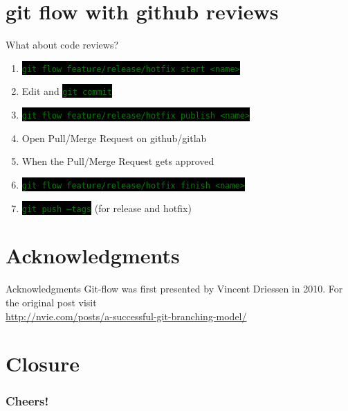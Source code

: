 \documentclass[
14pt,
aspectratio=169,
usenames,
dvipsnames,
x11names]{beamer}
\newcommand{\code}[1]{{\small\colorbox{black}{\textcolor{green}{\texttt{#1}}}}}
\begin{document}
\section{git flow with github reviews}

\begin{frame}{What about code reviews?}
  \begin{enumerate} \setlength{\itemsep}{\fill}
  \item \code{git flow feature/release/hotfix start <name>}
  \item Edit and \code{git commit}
  \item \code{git flow feature/release/hotfix publish <name>}
  \item Open Pull/Merge Request on github/gitlab
  \item When the Pull/Merge Request gets approved
  \item \code{git flow feature/release/hotfix finish <name>}
  \item \code{git push --tags} (for release and hotfix)
  \end{enumerate}
\end{frame}

\section{Acknowledgments}

\begin{frame}{Acknowledgments}
  Git-flow was first presented by \alert{Vincent Driessen} in 2010.
  \vfill
  For the original post visit\\
  {\small\url{http://nvie.com/posts/a-successful-git-branching-model/}}
\end{frame}

\section{Closure}
{
\begin{frame}[noframenumbering]
 \frametitle{\textbf{Cheers!}}
 \centering
 \titlepage
\end{frame}
}

\end{document}

